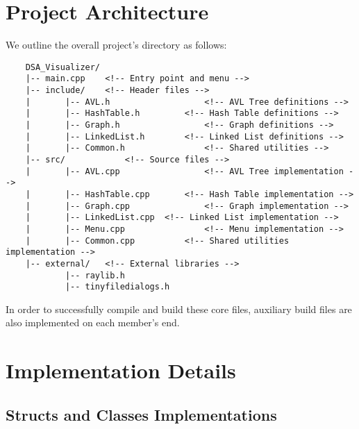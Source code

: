 \documentclass{article}
\begin{document}
\section{Project Architecture}
We outline the overall project's directory as follows:
\begin{lstlisting}
	DSA_Visualizer/
	|-- main.cpp 	<!-- Entry point and menu -->
	|-- include/ 	<!-- Header files -->
	|		|-- AVL.h 					<!-- AVL Tree definitions -->
	|		|-- HashTable.h			<!-- Hash Table definitions -->
	|		|-- Graph.h					<!-- Graph definitions -->
	|		|-- LinkedList.h 		<!-- Linked List definitions -->
	|		|-- Common.h 				<!-- Shared utilities -->
	|--	src/			<!-- Source files -->
	|		|-- AVL.cpp					<!-- AVL Tree implementation -->
	|		|-- HashTable.cpp		<!-- Hash Table implementation -->
	|		|-- Graph.cpp				<!-- Graph implementation -->
	|		|-- LinkedList.cpp	<!-- Linked List implementation -->
	|		|-- Menu.cpp				<!-- Menu implementation -->
	|		|-- Common.cpp			<!-- Shared utilities implementation -->
	|-- external/	<!-- External libraries -->
			|-- raylib.h
			|-- tinyfiledialogs.h
\end{lstlisting}
In order to successfully compile and build these core files, auxiliary build files are also implemented on each member's end.

\section{Implementation Details}
\subsection{Structs and Classes Implementations}
\end{document}
